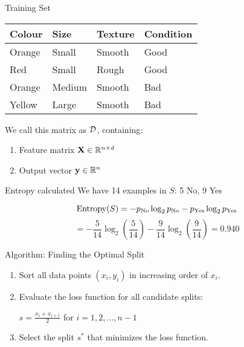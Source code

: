 \documentclass{beamer}
\begin{document}
\begin{frame}{Training Set}
\vspace{-5pt}
\begin{table}[]
	\begin{tabular}{|l|l|l||l|}
		\hline 
		\rowcolor{white}
		\textbf{Colour} & \textbf{Size} & \textbf{Texture} & \textbf{Condition} \\ \hline 
		Orange & Small & Smooth  & Good      \\
		Red    & Small  & Rough  & Good \\
		Orange & Medium & Smooth & Bad \\
		Yellow & Large  & Smooth & Bad \\ \hline 
	\end{tabular}
\end{table}

\pause
We call this matrix as $\mathcal{D}$, containing:
\begin{enumerate}
	\item Feature matrix $\mathbf{X} \in \mathbb{R}^{n \times d}$
	\item Output vector $\mathbf{y} \in \mathbb{R}^n$
\end{enumerate}
\end{frame}

\begin{frame}{Entropy calculated}
We have 14 examples in $S$: 5 No, 9 Yes

$$\operatorname{Entropy}(S) = -p_{\text{No}} \log_2 p_{\text{No}} - p_{\text{Yes}} \log_2 p_{\text{Yes}}$$
$$
= -\frac{5}{14} \log_2\left(\frac{5}{14}\right) - \frac{9}{14} \log_2\left(\frac{9}{14}\right) = 0.940
$$
\end{frame}

\begin{frame}{Algorithm: Finding the Optimal Split}
\begin{enumerate}
\item<1-> Sort all data points $(x_i, y_i)$ in increasing order of $x_i$.
\item<2-> Evaluate the loss function for all candidate splits:
\vspace{0.25cm}
\begin{center}
$s = \frac{x_i + x_{i+1}}{2}$ for $i = 1, 2, \ldots, n-1$
\end{center}
\vspace{0.25cm}
\item<2-> Select the split $s^*$ that minimizes the loss function.
\end{enumerate} 
\end{frame}
\end{document}
